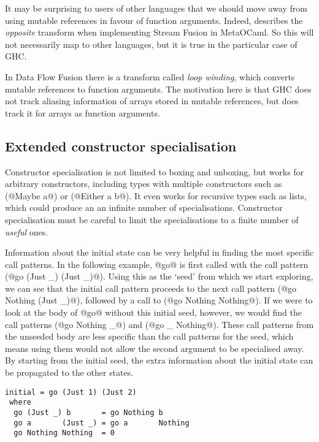 It may be surprising to users of other languages that we should move away from using mutable references in favour of function arguments.
Indeed, \citet{biboudis2017expressive} describes the \emph{opposite} transform when implementing Stream Fusion in MetaOCaml.
So this will not necessarily map to other languages, but it is true in the particular case of GHC.

In Data Flow Fusion \cite{lippmeier2013data} there is a transform called \emph{loop winding}, which converts mutable references to function arguments.
The motivation here is that GHC does not track aliasing information of arrays stored in mutable references, but does track it for arrays as function arguments.

\subsection{Extended constructor specialisation}

Constructor specialisation is not limited to boxing and unboxing, but works for arbitrary constructors, including types with multiple constructors such as (@Maybe a@) or (@Either a b@).
It even works for recursive types such as lists, which could produce an an infinite number of specialisations.
Constructor specialisation must be careful to limit the specialisations to a finite number of \emph{useful} ones.

Information about the initial state can be very helpful in finding the most specific call patterns.
In the following example, @go@ is first called with the call pattern (@go (Just _) (Just _)@).
Using this as the `seed' from which we start exploring, we can see that the initial call pattern proceeds to the next call pattern (@go Nothing (Just _)@), followed by a call to (@go Nothing Nothing@).
If we were to look at the body of @go@ without this initial seed, however, we would find the call patterns (@go Nothing _@) and (@go _ Nothing@).
These call patterns from the unseeded body are less specific than the call patterns for the seed, which means using them would not allow the second argument to be specialised away.
By starting from the initial seed, the extra information about the initial state can be propagated to the other states.

\begin{lstlisting}
initial = go (Just 1) (Just 2)
 where
  go (Just _) b       = go Nothing b
  go a       (Just _) = go a       Nothing
  go Nothing Nothing  = 0
\end{lstlisting}

